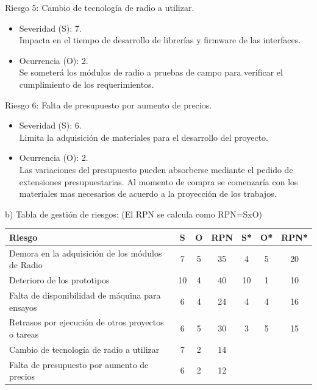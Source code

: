 \documentclass[
11pt%
]{charter}
\begin{document}
Riesgo 5: Cambio de tecnología de radio a utilizar.
\begin{itemize}
	\item Severidad (S): 7.\\Impacta en el tiempo de desarrollo de librerías y firmware de las interfaces.
	\item Ocurrencia (O): 2.\\Se someterá los módulos de radio a pruebas de campo para verificar el cumplimiento de los requerimientos.
\end{itemize}

Riesgo 6: Falta de presupuesto por aumento de precios.
\begin{itemize}
	\item Severidad (S): 6.\\Limita la adquisición de materiales para el desarrollo del proyecto.
	\item Ocurrencia (O): 2.\\Las variaciones del presupuesto pueden absorberse mediante el pedido de extensiones presupuestarias. Al momento de compra se comenzaría con los materiales mas necesarios de acuerdo a la proyección de los trabajos.
\end{itemize}

b) Tabla de gestión de riesgos:      (El RPN se calcula como RPN=SxO)

\begin{table}[htpb]
\centering
\begin{tabularx}{\linewidth}{@{}|X|c|c|c|c|c|c|@{}}
\hline
\rowcolor[HTML]{C0C0C0} 
Riesgo & S & O & RPN & S* & O* & RPN* \\ \hline
       Demora en la adquisición de los módulos de Radio& 7  &  5 &  35   &   4 &  5  &  20    \\ \hline
       Deterioro de los prototipos&  10 &  4&  40   &  10  & 1   &    10  \\ \hline
       Falta de disponibilidad de máquina para ensayos&  6 &  4 & 24    &4    &  4  &  16   \\ \hline
       Retrasos por ejecución de otros proyectos o tareas&  6 &  5 &  30   &  3  &   5 &  15    \\ \hline
       Cambio de tecnología de radio a utilizar&   7& 2   & 14 &    &    &      \\ \hline
       Falta de presupuesto por aumento de precios&   6& 2   & 12 &    &    &      \\ \hline
\end{tabularx}%
\end{table}
\end{document}
